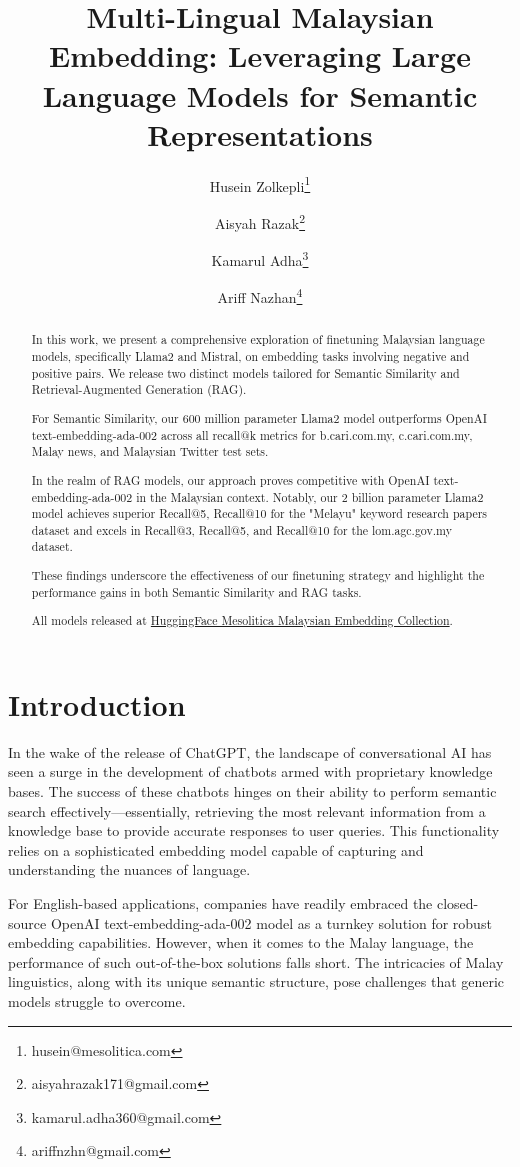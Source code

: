 \documentclass[preprint]{article}
\title{Multi-Lingual Malaysian Embedding: Leveraging Large Language Models for Semantic Representations}
\author{
  Husein Zolkepli\thanks{husein@mesolitica.com} \and
  Aisyah Razak\thanks{aisyahrazak171@gmail.com} \and
  Kamarul Adha\thanks{kamarul.adha360@gmail.com} \and
  Ariff Nazhan\thanks{ariffnzhn@gmail.com}
}
\begin{document}
\maketitle

\begin{abstract}
  In this work, we present a comprehensive exploration of finetuning Malaysian language models, specifically Llama2 and Mistral, on embedding tasks involving negative and positive pairs. We release two distinct models tailored for Semantic Similarity and Retrieval-Augmented Generation (RAG).

  For Semantic Similarity, our 600 million parameter Llama2 model outperforms OpenAI text-embedding-ada-002 across all recall@k metrics for b.cari.com.my, c.cari.com.my, Malay news, and Malaysian Twitter test sets.

  In the realm of RAG models, our approach proves competitive with OpenAI text-embedding-ada-002 in the Malaysian context. Notably, our 2 billion parameter Llama2 model achieves superior Recall@5, Recall@10 for the "Melayu" keyword research papers dataset and excels in Recall@3, Recall@5, and Recall@10 for the lom.agc.gov.my dataset.

  These findings underscore the effectiveness of our finetuning strategy and highlight the performance gains in both Semantic Similarity and RAG tasks.

  All models released at \href{https://huggingface.co/collections/mesolitica/malaysian-embedding-6523612bfe5881ad35f81b99}{HuggingFace Mesolitica Malaysian Embedding Collection}.

\end{abstract}

\section{Introduction}

In the wake of the release of ChatGPT, the landscape of conversational AI has seen a surge in the development of chatbots armed with proprietary knowledge bases. The success of these chatbots hinges on their ability to perform semantic search effectively—essentially, retrieving the most relevant information from a knowledge base to provide accurate responses to user queries. This functionality relies on a sophisticated embedding model capable of capturing and understanding the nuances of language.

For English-based applications, companies have readily embraced the closed-source OpenAI text-embedding-ada-002 model as a turnkey solution for robust embedding capabilities. However, when it comes to the Malay language, the performance of such out-of-the-box solutions falls short. The intricacies of Malay linguistics, along with its unique semantic structure, pose challenges that generic models struggle to overcome.
\end{document}
